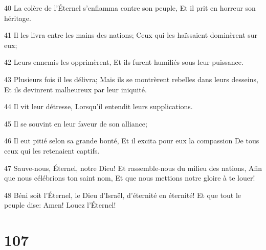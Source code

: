 \par 40 La colère de l'Éternel s'enflamma contre son peuple, Et il prit en horreur son héritage.
\par 41 Il les livra entre les mains des nations; Ceux qui les haïssaient dominèrent sur eux;
\par 42 Leurs ennemis les opprimèrent, Et ils furent humiliés sous leur puissance.
\par 43 Plusieurs fois il les délivra; Mais ils se montrèrent rebelles dans leurs desseins, Et ils devinrent malheureux par leur iniquité.
\par 44 Il vit leur détresse, Lorsqu'il entendit leurs supplications.
\par 45 Il se souvint en leur faveur de son alliance;
\par 46 Il eut pitié selon sa grande bonté, Et il excita pour eux la compassion De tous ceux qui les retenaient captifs.
\par 47 Sauve-nous, Éternel, notre Dieu! Et rassemble-nous du milieu des nations, Afin que nous célébrions ton saint nom, Et que nous mettions notre gloire à te louer!
\par 48 Béni soit l'Éternel, le Dieu d'Israël, d'éternité en éternité! Et que tout le peuple dise: Amen! Louez l'Éternel!

\chapter{107}

